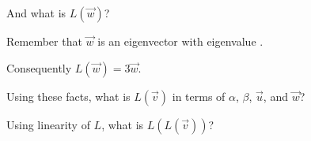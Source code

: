 \documentclass{ximera}
\begin{document}
\begin{question}
\begin{solution}
    \begin{multiple-choice}
    \end{multiple-choice}   
  \end{solution}
  
  And what is $L(\vec{w})$?
  \begin{solution}
    \begin{hint}
      \begin{question}
        \begin{solution}
          Remember that $\vec{w}$ is an eigenvector with eigenvalue .
        \end{solution}

        Consequently $L(\vec{w}) = 3 \vec{w}$.
      \end{question}
    \end{hint}
    
    \begin{multiple-choice}
    \end{multiple-choice}   
  \end{solution}
  
  Using these facts, what is $L(\vec{v})$ in terms of $\alpha$, $\beta$, $\vec{u}$, and $\vec{w}$?
  \begin{solution}
    \begin{multiple-choice}
    \end{multiple-choice} 
  \end{solution}
  
  \begin{solution}
    \begin{hint}
      \begin{question}
        \begin{solution}
          Using linearity of $L$, what is $L(L(\vec{v}))$?

          \begin{multiple-choice}
          \end{multiple-choice} 
        \end{solution}
      \end{question}
    \end{hint}


\end{solution}
\end{question}
\end{document}
